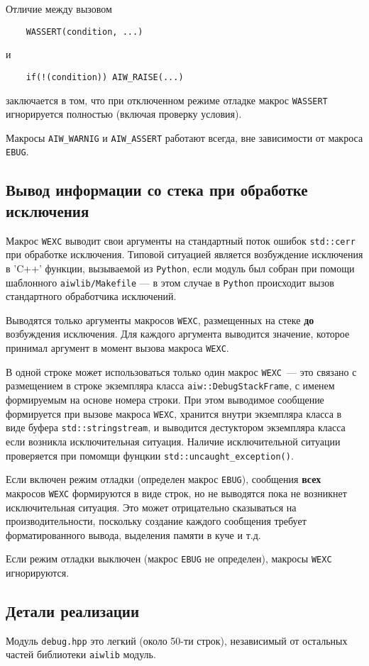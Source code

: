 Отличие между вызовом 
\begin{verbatim}
    WASSERT(condition, ...)
\end{verbatim}
и
\begin{verbatim}
    if(!(condition)) AIW_RAISE(...)
\end{verbatim}
заключается в том, что при отключенном режиме отладке макрос \verb'WASSERT' игнорируется полностью (включая проверку условия).

Макросы \verb'AIW_WARNIG' и \verb'AIW_ASSERT' работают всегда, вне зависимости от макроса \verb'EBUG'.

\subsection{Вывод информации со стека при обработке исключения}
Макрос \verb'WEXC' выводит свои аргументы на стандартный поток ошибок \verb'std::cerr' при обработке исключения.
Типовой ситуацией является возбуждение исключения в \veb'C++' функции, вызываемой из \verb'Python', если
модуль был собран при помощи шаблонного \verb'aiwlib/Makefile' --- в этом случае в \verb'Python' происходит
вызов стандартного обработчика исключений.

Выводятся только аргументы макросов \verb'WEXC', размещенных на стеке {\bf до} возбуждения исключения.
Для каждого аргумента выводится значение, которое принимал аргумент в момент вызова макроса \verb'WEXC'.

В одной строке может использоваться только один макрос \verb'WEXC'~--- это связано с размещением в строке
экземпляра класса \verb'aiw::DebugStackFrame', с именем формируемым на основе номера строки.
При этом выводимое сообщение формируется при вызове макроса \verb'WEXC', хранится внутри экземпляра класса в виде
буфера \verb'std::stringstream', и выводится дестуктором экземпляра класса если возникла исключительная ситуация.
Наличие исключительной ситуации проверяется при помомщи фунцкии \verb'std::uncaught_exception()'.

Если включен режим отладки (определен макрос \verb'EBUG'), сообщения {\bf всех} макросов \verb'WEXC' формируются в виде строк,
но не выводятся пока не возникнет исключительная ситуация.
Это может отрицательно сказываться на производительности, поскольку создание каждого сообщения
требует форматированного вывода, выделения памяти в куче и т.д.

Если режим отладки выключен (макрос \verb'EBUG' не определен), макросы \verb'WEXC' игнорируются.


\subsection{Детали реализации}
Модуль \verb'debug.hpp' это легкий (около 50-ти строк), независимый от остальных частей библиотеки \verb'aiwlib' модуль.

